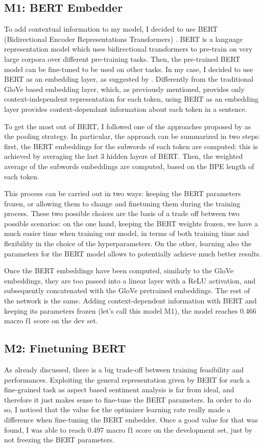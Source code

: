 \documentclass[11pt,a4paper]{article}
\begin{document}
	\subsection{M1: BERT Embedder}
	To add contextual information to my model, I decided to use BERT (Bidirectional
	Encoder Representations Transformers) \citep{devlin2018bert}. BERT is a language
	representation model which uses bidirectional transformers to pre-train on
	very large corpora over different pre-training tasks. Then, the pre-trained BERT
	model can be fine-tuned to be used on other tasks. In my case, I decided to use
	BERT as an embedding layer, as suggested by \citep{li2019exploiting}. Differently
	from the traditional GloVe based embedding layer, which, as previously mentioned,
	provides only context-independent representation for each token, using BERT as an
	embedding layer provides context-dependant information about each token in a
	sentence.
	
	To get the most out of BERT, I followed one of the approaches proposed by
	\citep{acs2021subword} as the pooling strategy. In particular, the approach can be
	summarized in two steps: first, the BERT embeddings for the subwords of each
	token are computed: this is achieved by averaging the last 3 hidden layers of
	BERT. Then, the weighted average of the subwords embeddings are computed, based
	on the BPE length of each token.
	
	This process can be carried out in two ways: keeping the BERT parameters
	frozen, or allowing them to change and finetuning them during the training process.
	These two possible choices are the basis of a trade off between two possible
	scenarios: on the one hand, keeping the BERT weights frozen, we have a much
	easier time when training our model, in terms of both training time and
	flexibility in the choice of the hyperparameters. On the other, learning also
	the parameters for the BERT model allows to potentially achieve much better results.
	
	Once the BERT embeddings have been computed, similarly to the GloVe embeddings,
	they are too passed into a linear layer with a ReLU activation, and subsequently
	concatenated with the GloVe pretrained embeddings. The rest of the network is
	the same. Adding context-dependent information with BERT and keeping its
	parameters frozen (let's call this model M1), the model reaches 0.466 macro f1
	score on the dev set.
	
	\subsection{M2: Finetuning BERT}
	As already discussed, there is a big trade-off between training feasibility and
	performances. Exploiting the general representation given by BERT for
	such a fine-grained task as aspect based sentiment analysis is far from ideal,
	and therefore it just makes sense to fine-tune the BERT parameters. In order to
	do so, I noticed that the value for the optimizer learning rate really made a
	difference when fine-tuning the BERT embedder. Once a good value for that was
	found, I was able to reach 0.497 macro f1 score on the development set, just by
	not freezing the BERT parameters.
	
\end{document}
